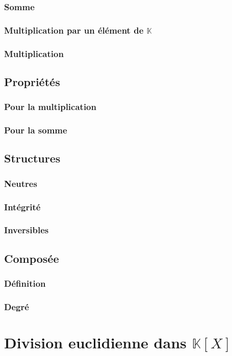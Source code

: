 \documentclass[12pt,a4paper,french]{book}
\begin{document}
			\subsubsection{Somme}
			\subsubsection{Multiplication par un élément de $\mathbb{K}$}
			\subsubsection{Multiplication}
		\subsection{Propriétés}
			\subsubsection{Pour la multiplication}
			\subsubsection{Pour la somme}
		\subsection{Structures}
			\subsubsection{Neutres}
			\subsubsection{Intégrité}
			\subsubsection{Inversibles}
		\subsection{Composée}
			\subsubsection{Définition}
			\subsubsection{Degré}
	\section{Division euclidienne dans $\mathbb{K}[X]$}
\end{document}
